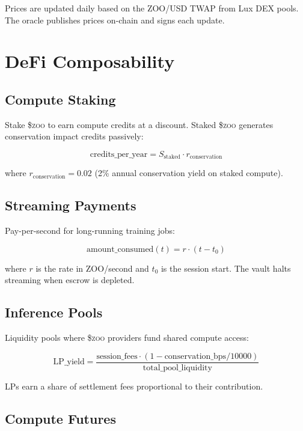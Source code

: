 \documentclass[11pt,letterpaper]{article}
\newcommand{\ZOO}{\$\textsc{zoo}}
\begin{document}
Prices are updated daily based on the ZOO/USD TWAP from Lux DEX pools. The oracle publishes prices on-chain and signs each update.

\section{DeFi Composability}
\label{sec:defi}

\subsection{Compute Staking}

Stake \ZOO{} to earn compute credits at a discount. Staked \ZOO{} generates conservation impact credits passively:

\begin{equation}
\text{credits\_per\_year} = S_{\text{staked}} \cdot r_{\text{conservation}}
\end{equation}

where $r_{\text{conservation}} = 0.02$ (2\% annual conservation yield on staked compute).

\subsection{Streaming Payments}

Pay-per-second for long-running training jobs:

\begin{equation}
\text{amount\_consumed}(t) = r \cdot (t - t_0)
\end{equation}

where $r$ is the rate in ZOO/second and $t_0$ is the session start. The vault halts streaming when escrow is depleted.

\subsection{Inference Pools}

Liquidity pools where \ZOO{} providers fund shared compute access:

\begin{equation}
\text{LP\_yield} = \frac{\text{session\_fees} \cdot (1 - \text{conservation\_bps} / 10000)}{\text{total\_pool\_liquidity}}
\end{equation}

LPs earn a share of settlement fees proportional to their contribution.

\subsection{Compute Futures}
\end{document}
